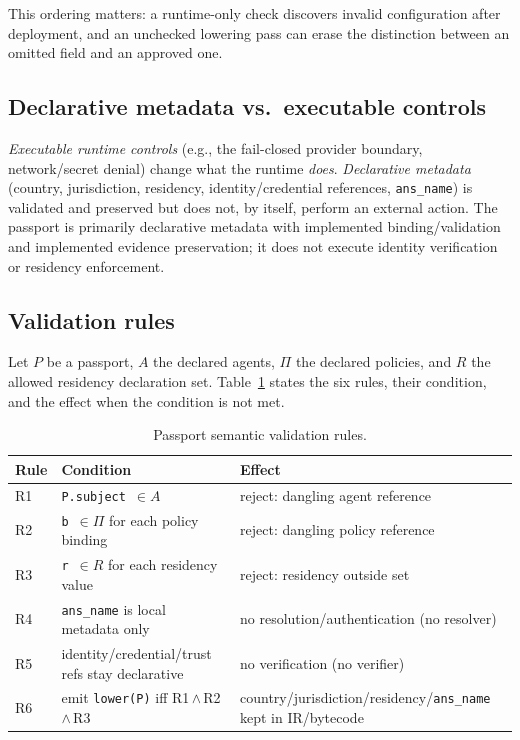 \documentclass[conference]{IEEEtran}
\newcommand{\code}[1]{\texttt{\small #1}}
\begin{document}
This ordering matters: a runtime-only check discovers invalid configuration
after deployment, and an unchecked lowering pass can erase the distinction
between an omitted field and an approved one.

\subsection{Declarative metadata vs.\ executable controls}
\emph{Executable runtime controls} (e.g., the fail-closed provider boundary,
network/secret denial) change what the runtime \emph{does}. \emph{Declarative
metadata} (country, jurisdiction, residency, identity/credential references,
\code{ans\_name}) is validated and preserved but does not, by itself, perform an
external action. The passport is primarily declarative metadata with implemented
binding/validation and implemented evidence preservation; it does not execute
identity verification or residency enforcement.

\subsection{Validation rules}
Let $P$ be a passport, $A$ the declared agents, $\Pi$ the declared policies, and
$R$ the allowed residency declaration set. Table~\ref{tab:rules} states the six
rules, their condition, and the effect when the condition is not met.

\begin{table}[t]
\centering
\caption{Passport semantic validation rules.}
\label{tab:rules}
\renewcommand{\arraystretch}{1.25}
\setlength{\tabcolsep}{4pt}
\footnotesize
\begin{tabular}{@{}p{}p{}p{}@{}}
\toprule
\textbf{Rule} & \textbf{Condition} & \textbf{Effect} \\
\midrule
R1 & \code{P.subject}~$\in A$ & reject: dangling agent reference \\
R2 & \code{b}~$\in \Pi$ for each policy binding & reject: dangling policy reference \\
R3 & \code{r}~$\in R$ for each residency value & reject: residency outside set \\
R4 & \code{ans\_name} is local metadata only & no resolution/\allowbreak authentication (no resolver) \\
R5 & identity/\allowbreak credential/\allowbreak trust refs stay declarative & no verification (no verifier) \\
R6 & emit \code{lower(P)} iff R1\,$\wedge$\,R2\,$\wedge$\,R3 & country/\allowbreak jurisdiction/\allowbreak residency/\allowbreak\code{ans\_name} kept in IR/\allowbreak bytecode \\
\bottomrule
\end{tabular}
\end{table}
\end{document}
